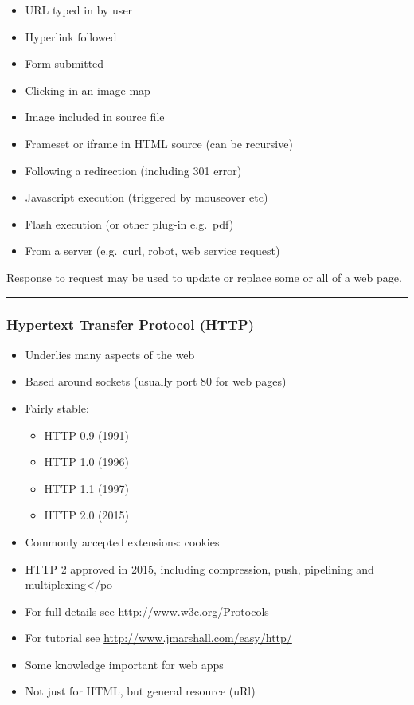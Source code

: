 \documentclass{article}[18pt]
\providecommand{\tightlist}{%
  \setlength{\itemsep}{0pt}\setlength{\parskip}{0pt}}
\begin{document}
\begin{itemize}
\tightlist
\item
  URL typed in by user
\item
  Hyperlink followed
\item
  Form submitted
\item
  Clicking in an image map
\item
  Image included in source file
\item
  Frameset or iframe in HTML source (can be recursive)
\item
  Following a redirection (including 301 error)
\item
  Javascript execution (triggered by mouseover etc)
\item
  Flash execution (or other plug-in e.g.~pdf)
\item
  From a server (e.g.~curl, robot, web service request)
\end{itemize}

Response to request may be used to update or replace some or all of a
web page.

\begin{center}\rule{0.5\linewidth}{\linethickness}\end{center}

\hypertarget{hypertext-transfer-protocol-http}{%
\subsubsection{Hypertext Transfer Protocol
(HTTP)}\label{hypertext-transfer-protocol-http}}

\begin{itemize}
\tightlist
\item
  Underlies many aspects of the web
\item
  Based around sockets (usually port 80 for web pages)
\item
  Fairly stable:

  \begin{itemize}
  \tightlist
  \item
    HTTP 0.9 (1991)
  \item
    HTTP 1.0 (1996)
  \item
    HTTP 1.1 (1997)
  \item
    HTTP 2.0 (2015)
  \end{itemize}
\item
  Commonly accepted extensions: cookies
\item
  HTTP 2 approved in 2015, including compression, push, pipelining and
  multiplexing\textless{}/po
\item
  For full details see \url{http://www.w3c.org/Protocols}
\item
  For tutorial see \url{http://www.jmarshall.com/easy/http/}
\item
  Some knowledge important for web apps
\item
  Not just for HTML, but general resource (uRl)
\end{itemize}
\end{document}
